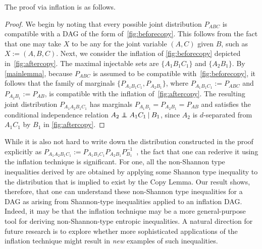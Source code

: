 {The proof via inflation is as follows.
\begin{proof}
	We begin by noting that every possible joint distribution $P_{ABC}$ is compatible with a DAG of the form of~\cref{fig:beforecopy}.  This follows from the fact that one may take $X$ to be any  for the joint variable $(A,C)$ given $B$, such as $X := (A,B,C)$.  Next, we consider the inflation of \cref{fig:beforecopy} depicted in~\cref{fig:aftercopy}. The maximal injectable sets are $\{ A_1 B_1 C_1\}$ and $\{A_2 B_1\}$.  By \cref{mainlemma}, because $P_{ABC}$ is assumed to be compatible with~\cref{fig:beforecopy}, it follows that the family of marginals $\{ P_{A_1 B_1 C_1}, P_{A_2 B_1}\}$, where $P_{A_1 B_1 C_1}:= P_{A B C}$ and $P_{A_2 B_1} := P_{AB}$, is compatible with the inflation of~\cref{fig:aftercopy}. The resulting joint distribution $P_{A_1 A_2 B_1 C_1}$ has marginals $P_{A_1 B_1}= P_{A_2 B_1} =P_{AB}$ and satisfies the conditional independence relation $A_2 \perp\!\!\!\!\perp A_1 C_1 \:|\: B_1$, since $A_2$ is $d$-separated from $A_1 C_1$ by $B_1$ in \cref{fig:aftercopy}.
\end{proof}

While it is also not hard to write down the distribution constructed in the proof explicitly as $P_{A_1 A_2 B_1 C_1} := P_{A_1 B_1 C_1} P_{A_2 B_1} P_{B_1}^{-1}$~\cite[Lemma~15.8]{yeung_network_2008}, the fact that one can rederive it using the inflation technique is significant.  For one, all the non-Shannon type inequalities derived by \citet{zeger_2011_nonshannon} are obtained by applying some Shannon type inequality to the distribution that is implied to exist by the Copy Lemma.  Our result shows, therefore, that one can understand these non-Shannon type inequalities for a DAG as arising from Shannon-type inequalities applied to an inflation DAG.  Indeed, it may be that the inflation technique may be a more general-purpose tool for deriving non-Shannon-type entropic inequalities.  A natural direction for future research is to explore whether more sophisticated applications of the inflation technique might result  in \emph{new} examples of such inequalities. 

}
